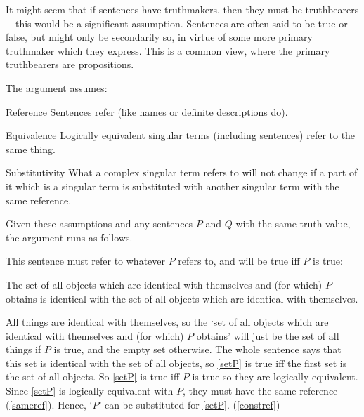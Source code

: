 It might seem that if sentences have truthmakers, then they must be truthbearers---this would be a significant assumption.
Sentences are often said to be true or false, but might only be secondarily so, in virtue of some more primary truthmaker which they express.
This is a common view, where the primary truthbearers are propositions.

The argument assumes:
\parencite[753]{Davidson_1969}

	\begin{principle}{Reference}\label{srefer}
	Sentences refer (like names or definite descriptions do).
	\end{principle}

	\begin{principle}{Equivalence}\label{sameref}
	Logically equivalent singular terms (including sentences) refer to the same thing.
	\end{principle}

	\begin{principle}{Substitutivity}\label{constref}
	What a complex singular term refers to will not change if a part of it which is a singular term is substituted with another singular term with the same reference.
	\end{principle}


Given these assumptions and any sentences $P$ and $Q$ with the same truth value, the argument runs as follows.

This sentence must refer to whatever $P$ refers to, and will be true iff $P$ is true:

	\begin{example}\label{setP}
	The set of all objects which are identical with themselves and (for which) $P$ obtains is identical with the set of all objects which are identical with themselves.
	\end{example}

All things are identical with themselves, so the `set of all objects which are identical with themselves and (for which) $P$ obtains' will just be the set of all things if $P$ is true, and the empty set otherwise.
The whole sentence says that this set is identical with the set of all objects, so \ref{setP} is true iff the first set is the set of all objects.
So \ref{setP} is true iff $P$ is true so they are logically equivalent.
Since \ref{setP} is logically equivalent with $P$, they must have the same reference (\ref{sameref}).
Hence, `$P$' can be substituted for \ref{setP}.
(\ref{constref})

